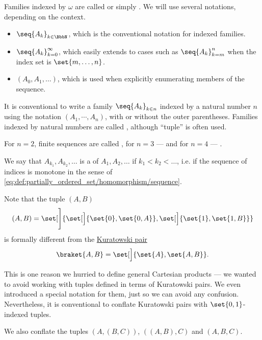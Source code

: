 \begin{definition}\label{def:sequence}
  Families indexed by \( \omega \) are called  or simply . We will use several notations, depending on the context.
  \begin{itemize}
    \item \( \seq{ A_k }_{k \in \BbbN} \), which is the conventional notation for indexed families.
    \item \( \seq{ A_k }_{k=0}^\infty \), which easily extends to cases such as \( \seq{ A_k }_{k=m}^n \) when the index set is \( \set{ m, \ldots, n } \).
    \item \( (A_0, A_1, \ldots) \), which is used when explicitly enumerating members of the sequence.
  \end{itemize}

  It is conventional to write a family \( \seq{ A_k }_{k \in n} \) indexed by a natural number \( n \) using the notation \( (A_1, \cdots, A_n) \), with or without the outer parentheses. Families indexed by natural numbers are called , although \enquote{tuple} is often used.

  For \( n = 2 \), finite sequences are called , for \( n = 3 \) ---  and for \( n = 4 \) --- .

  We say that \( A_{k_1}, A_{k_2}, \ldots \) is a  of \( A_1, A_2, \ldots \) if \( k_1 < k_2 < \ldots \), i.e. if the sequence of indices is monotone in the sense of \eqref{eq:def:partially_ordered_set/homomorphism/sequence}.
\end{definition}

\begin{remark}\label{rem:kuratowski_pairs_and_tuples}
  Note that the tuple \( (A, B) \)
  \begin{equation*}
    (A, B) = \set[\Bigg]{ \set[\Big]{ \set{ 0 }, \set{ 0, A } }, \set[\Big]{ \set{ 1 }, \set{ 1, B } } }
  \end{equation*}
  is formally different from the \hyperref[def:cartesian_product/kuratowski_pair]{Kuratowski pair}
  \begin{equation*}
    \braket{ A, B } = \set[\Big]{ \set{ A }, \set{ A, B } }.
  \end{equation*}

  This is one reason we hurried to define general Cartesian products --- we wanted to avoid working with tuples defined in terms of Kuratowski pairs. We even introduced a special notation for them, just so we can avoid any confusion. Nevertheless, it is conventional to conflate Kuratowski pairs with \( \set{ 0, 1 } \)-indexed tuples.

  We also conflate the tuples \( (A, (B, C)) \), \( ((A, B), C) \) and \( (A, B, C) \).
\end{remark}

